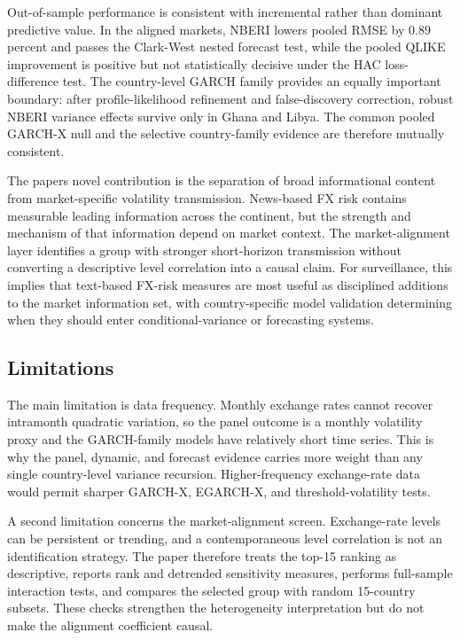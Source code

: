 \documentclass[11pt]{article}
\begin{document}
Out-of-sample performance is consistent with incremental rather than
dominant predictive value. In the aligned markets, NBERI lowers pooled
RMSE by 0.89 percent and passes the Clark-West nested forecast test,
while the pooled QLIKE improvement is positive but not statistically
decisive under the HAC loss-difference test. The country-level GARCH
family provides an equally important boundary: after profile-likelihood
refinement and false-discovery correction, robust NBERI variance effects
survive only in Ghana and Libya. The common pooled GARCH-X null and the
selective country-family evidence are therefore mutually consistent.

The paper\textquotesingle s novel contribution is the separation of
broad informational content from market-specific volatility
transmission. News-based FX risk contains measurable leading information
across the continent, but the strength and mechanism of that information
depend on market context. The market-alignment layer identifies a group
with stronger short-horizon transmission without converting a
descriptive level correlation into a causal claim. For surveillance,
this implies that text-based FX-risk measures are most useful as
disciplined additions to the market information set, with
country-specific model validation determining when they should enter
conditional-variance or forecasting systems.

\subsection{Limitations}

The main limitation is data frequency. Monthly exchange rates cannot
recover intramonth quadratic variation, so the panel outcome is a
monthly volatility proxy and the GARCH-family models have relatively
short time series. This is why the panel, dynamic, and forecast evidence
carries more weight than any single country-level variance recursion.
Higher-frequency exchange-rate data would permit sharper GARCH-X,
EGARCH-X, and threshold-volatility tests.

A second limitation concerns the market-alignment screen. Exchange-rate
levels can be persistent or trending, and a contemporaneous level
correlation is not an identification strategy. The paper therefore
treats the top-15 ranking as descriptive, reports rank and detrended
sensitivity measures, performs full-sample interaction tests, and
compares the selected group with random 15-country subsets. These checks
strengthen the heterogeneity interpretation but do not make the
alignment coefficient causal.
\end{document}
